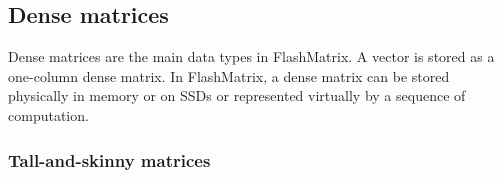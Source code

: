 

\subsection{Dense matrices}
Dense matrices are the main data types in FlashMatrix. A vector is stored
as a one-column dense matrix. In FlashMatrix, a dense matrix can be stored
physically in memory or on SSDs or represented virtually by a sequence of
computation.


\subsubsection{Tall-and-skinny matrices} \label{sec:tas_mat}

